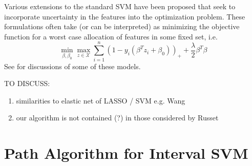 \documentclass[10pt]{article}
\theoremstyle{definition}
\begin{document}
Various extensions to the standard SVM have been proposed that seek to incorporate uncertainty in the features into the optimization problem. These formulations often take (or can be interpreted) as minimizing the objective function for a worst case allocation of features in some fixed set, i.e.
\begin{equation}
\label{eq:svm_minimax}
\min_{\beta,\beta_0}  \max_{z \in \mathcal{X}} \sum_{i=1}^n (1 - y_i(\beta^Tz_i + \beta_0))_{+} + \frac{\lambda}{2}\beta^T\beta
\end{equation}
See \cite{bhattacharyya2004robust,shivaswamy2006second,ben2011chance} for discussions of some of these models.



TO DISCUSS:
\begin{enumerate}
\item similarities to elastic net of LASSO / SVM e.g. Wang \cite{wang2007hybrid}
\item our algorithm is not contained (?) in those considered by Russet \cite{rosset2007piecewise}
\end{enumerate}


\section{Path Algorithm for Interval SVM}
\end{document}
